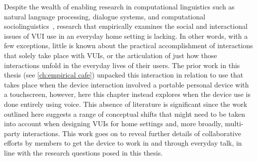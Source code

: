 Despite the wealth of enabling research in computational linguistics such as natural language processing, dialogue systems, and computational sociolinguistics~\citep{Nguyen2016}, research that empirically examines the social and interactional issues of \ac{VUI} use in an everyday home setting is lacking.
In other words, with a few exceptions, little is known about the practical accomplishment of interactions that solely take place with \acp{VUI}, or the articulation of just how those interactions unfold in the everyday lives of their users.
The prior work in this thesis (see \autoref{ch:empirical cafe}) unpacked this interaction in relation to use that takes place when the device interaction involved a portable personal device with a touchscreen, however, here this chapter instead explores  when the device use is done entirely using voice.
This absence of literature is significant since the work outlined here suggests a range of conceptual shifts that might need to be taken into account when designing \acp{VUI} for home settings and, more broadly, multi-party interactions.
This work goes on to reveal further details of collaborative efforts by members to get the device to work in and through everyday talk, in line with the research questions posed in this thesis.







